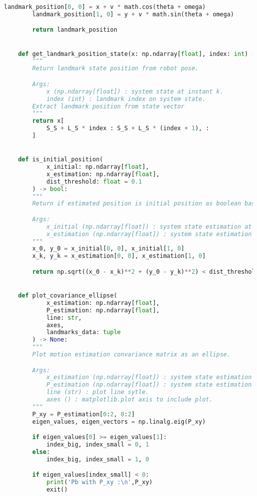 \documentclass[../CSC_5RO12_TA_TP4.tex]{subfiles}
\begin{document}
\begin{scriptsize}
\begin{lstlisting}[language=Python]
        landmark_position[0, 0] = x + v * math.cos(theta + omega)
        landmark_position[1, 0] = y + v * math.sin(theta + omega)

        return landmark_position


    def get_landmark_position_state(x: np.ndarray[float], index: int) -> np.ndarray[float]:
        """
        Return landmark state position from robot pose.

        Args:
            x (np.ndarray[float]) : system state at instant k.
            index (int) : landmark index on system state.
        Extract landmark position from state vector
        """
        return x[
            S_S + L_S * index : S_S + L_S * (index + 1), :
        ]


    def is_initial_position(
            x_initial: np.ndarray[float],
            x_estimation: np.ndarray[float],
            dist_threshold: float = 0.1
        ) -> bool:
        """
        Return if estimated position is initial position as boolean based on a distance threshold.

        Args:
            x_initial (np.ndarray[float]) : system state estimation at instant 0.
            x_estimation (np.ndarray[float]) : system state estimation at instant k.
        """
        x_0, y_0 = x_initial[0, 0], x_initial[1, 0]
        x_k, y_k = x_estimation[0, 0], x_estimation[1, 0]

        return np.sqrt((x_0 - x_k)**2 + (y_0 - y_k)**2) < dist_threshold


    def plot_covariance_ellipse(
            x_estimation: np.ndarray[float],
            P_estimation: np.ndarray[float],
            line: str,
            axes,
            landmarks_data: tuple
        ) -> None:
        """
        Plot motion estimation convariance matrix as an ellipse.

        Args:
            x_estimation (np.ndarray[float]) : system state estimation at instant k.
            P_estimation (np.ndarray[float]) : system state estimation covariance at instant k-1.
            line (str) : plot line sytle.
            axes () : matplotlib.plot axis to include plot.
        """
        P_xy = P_estimation[0:2, 0:2]
        eigen_values, eigen_vectors = np.linalg.eig(P_xy)

        if eigen_values[0] >= eigen_values[1]:
            index_big, index_small = 0, 1
        else:
            index_big, index_small = 1, 0

        if eigen_values[index_small] < 0:
            print('Pb with P_xy :\n',P_xy)
            exit()


\end{lstlisting}
\end{scriptsize}
\end{document}
